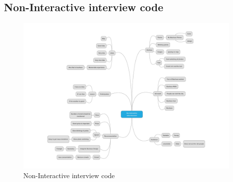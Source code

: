 \begin{appendices}
\section{Non-Interactive interview code}
\begin{minipage}{1.14\textwidth}
\begin{flushleft} 
\begin{figure}[H]
 \centering 
    \includegraphics[width = \textwidth, height=0.8\textheight]{Appendices/8/non-interactive/non-interactive_code.pdf}
    \caption{Non-Interactive interview code}
     \label{app:non-interactiveinterviewcode_}%
\end{figure}
\end{flushleft} 
\end{minipage}



\end{appendices}
